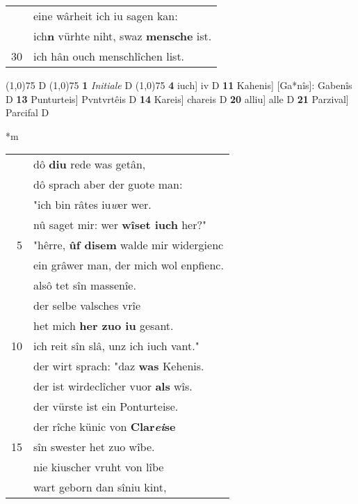 \documentclass[8pt,a4paper,notitlepage]{article}
\begin{document}
\begin{table}[ht]
\begin{minipage}[t]{0.5\linewidth}
\begin{tabular}{rl}
 & eine wârheit ich iu sagen kan:\\ 
 & ich\textbf{n} vürhte niht, swaz \textbf{mensche} ist.\\ 
30 & ich hân ouch menschlîchen list.\\ 
\end{tabular}
\scriptsize
\line(1,0){75} \newline
D \newline
\line(1,0){75} \newline
\textbf{1} \textit{Initiale} D  \newline
\line(1,0){75} \newline
\textbf{4} iuch] iv D \textbf{11} Kahenis] [Ga*nîs]: Gabenîs D \textbf{13} Punturteis] Pvntvrtêis D \textbf{14} Kareis] chareis D \textbf{20} alliu] alle D \textbf{21} Parzival] Parcifal D \newline
\end{minipage}
\hspace{0.5cm}
\begin{minipage}[t]{0.5\linewidth}
\small
\begin{center}*m
\end{center}
\begin{tabular}{rl}
 & dô \textbf{diu} rede was getân,\\ 
 & dô sprach aber der guote man:\\ 
 & "ich bin râtes iu\textit{w}er wer.\\ 
 & nû saget mir: wer \textbf{wîset iuch} her?"\\ 
5 & "hêrre, \textbf{ûf disem} walde mir widergienc\\ 
 & ein grâwer man, der mich wol enpfienc.\\ 
 & alsô tet sîn massenîe.\\ 
 & der selbe valsches vrîe\\ 
 & het mich \textbf{her zuo iu} gesant.\\ 
10 & ich reit sîn slâ, unz ich iuch vant."\\ 
 & der wirt sprach: "daz \textbf{was} Kehenis.\\ 
 & der ist wirdeclîcher vuor \textbf{als} wîs.\\ 
 & der vürste ist ein Ponturteise.\\ 
 & der rîche künic von \textbf{Clar\textit{ei}se}\\ 
15 & sîn swester het zuo wîbe.\\ 
 & nie kiuscher vruht von lîbe\\ 
 & wart geborn dan sîniu kint,\\ 

\end{tabular}
\end{minipage}
\end{table}
\end{document}
